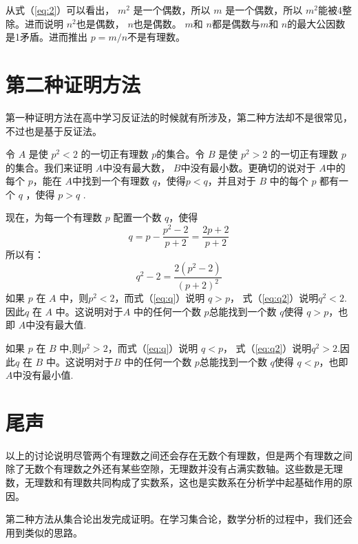 \documentclass[10pt,a4paper,UTF8]{article}
\begin{document}
从式（\ref{eq:2}）可以看出， \(m^{2}\) 是一个偶数，所以 \(m\) 是一个偶数，所以 \(m^{2}\)能被4整除。进而说明 \(n^{2}\)也是偶数， \(n\)也是偶数。 \(m\)和 \(n\)都是偶数与\(m\)和 \(n\)的最大公因数是1矛盾。进而推出 \(p=m/n\)不是有理数。
\section{第二种证明方法}
\label{sec:orgf9ea3a6}


第一种证明方法在高中学习反证法的时候就有所涉及，第二种方法却不是很常见，不过也是基于反证法。

令 \(A\) 是使 \(p^{2}<2\) 的一切正有理数 \(p\)的集合。令 \(B\) 是使 \(p^{2}>2\) 的一切正有理数 \(p\)的集合。我们来证明 \(A\)中没有最大数， \(B\)中没有最小数。更确切的说对于 \(A\)中的每个 \(p\)，能在 \(A\)中找到一个有理数 \(q\)，使得\(p {<} q\)，并且对于 \(B\) 中的每个 \(p\) 都有一个 \(q\) ，使得 \(p {>} q\) .

现在，为每一个有理数 \(p\) 配置一个数 \(q\)，使得
\begin{equation}
\label{eq:q}
q = p - \frac{p^{2}-2}{p+2}= \frac{2p+2}{p+2}
\end{equation}
所以有：
\begin{equation}
\label{eq:q2}
q^{2} -2 = \frac{2(p^{2}-2)}{(p+2)^{2}}
\end{equation}
如果 \(p\) 在 \(A\) 中，则\(p^{2}<2\)，而式（\ref{eq:q}）说明 \(q {>} p\)， 式（\ref{eq:q2}）说明\(q^{2}<2\).因此\(q\) 在 \(A\) 中。这说明对于\(A\) 中的任何一个数 \(p\)总能找到一个数 \(q\)使得 \(q {>} p\)，也即 \(A\)中没有最大值.

如果 \(p\) 在 \(B\) 中,则\(p^{2}>2\)，而式（\ref{eq:q}）说明 \(q {<} p\)， 式（\ref{eq:q2}）说明\(q^{2}>2\).因此\(q\) 在 \(B\) 中。这说明对于\(B\) 中的任何一个数 \(p\)总能找到一个数 \(q\)使得 \(q {<} p\)，也即 \(A\)中没有最小值.
\section{尾声}
\label{sec:org63881f3}


以上的讨论说明尽管两个有理数之间还会存在无数个有理数，但是两个有理数之间除了无数个有理数之外还有某些空隙，无理数并没有占满实数轴。这些数是无理数，无理数和有理数共同构成了实数系，这也是实数系在分析学中起基础作用的原因。

第二种方法从集合论出发完成证明。在学习集合论，数学分析的过程中，我们还会用到类似的思路。
\end{document}
